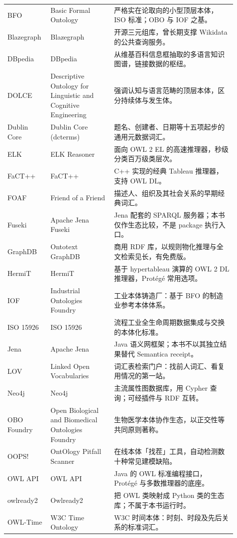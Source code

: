 \begin{longtable}{@{}p{0.16\linewidth}p{0.26\linewidth}p{0.5\linewidth}@{}}
BFO & Basic Formal Ontology & 严格实在论取向的小型顶层本体，ISO 标准；OBO 与 IOF 之基。 \\
Blazegraph & Blazegraph & 开源三元组库，曾长期支撑 Wikidata 的公共查询服务。 \\
DBpedia & DBpedia & 从维基百科信息框抽取的多语言知识图谱，链接数据的枢纽。 \\
DOLCE & Descriptive Ontology for Linguistic and Cognitive Engineering & 强调认知与语言范畴的顶层本体，区分持续体与发生体。 \\
Dublin Core & Dublin Core (dcterms) & 题名、创建者、日期等十五项起步的通用元数据词汇。 \\
ELK & ELK Reasoner & 面向 OWL 2 EL 的高速推理器，秒级分类百万级类层次。 \\
FaCT++ & FaCT++ & C++ 实现的经典 Tableau 推理器，支持 OWL DL。 \\
FOAF & Friend of a Friend & 描述人、组织及其社会关系的早期经典词汇。 \\
Fuseki & Apache Jena Fuseki & Jena 配套的 SPARQL 服务器；本书仅作生态比较，不是 package 执行入口。 \\
GraphDB & Ontotext GraphDB & 商用 RDF 库，以规则物化推理与全文检索见长，有免费版。 \\
HermiT & HermiT & 基于 hypertableau 演算的 OWL 2 DL 推理器，Protégé 常用选项。 \\
IOF & Industrial Ontologies Foundry & 工业本体铸造厂：基于 BFO 的制造业参考本体体系。 \\
ISO 15926 & ISO 15926 & 流程工业全生命周期数据集成与交换的本体化标准。 \\
Jena & Apache Jena & Java 语义网框架；本书不以其独立结果替代 Semantica receipt。 \\
LOV & Linked Open Vocabularies & 词汇表检索门户：找前人词汇、看复用情况的第一站。 \\
Neo4j & Neo4j & 主流属性图数据库，用 Cypher 查询；可经插件与 RDF 互转。 \\
OBO Foundry & Open Biological and Biomedical Ontologies Foundry & 生物医学本体协作生态，以正交性等共同原则著称。 \\
OOPS! & OntOlogy Pitfall Scanner & 在线本体「找茬」工具，自动检测数十种常见建模缺陷。 \\
OWL API & OWL API & Java 的 OWL 标准编程接口，Protégé 与多数推理器的底座。 \\
owlready2 & Owlready2 & 把 OWL 类映射成 Python 类的生态库；不属于本书运行时。 \\
OWL-Time & W3C Time Ontology & W3C 时间本体：时刻、时段及先后关系的标准词汇。 \\

\end{longtable}
